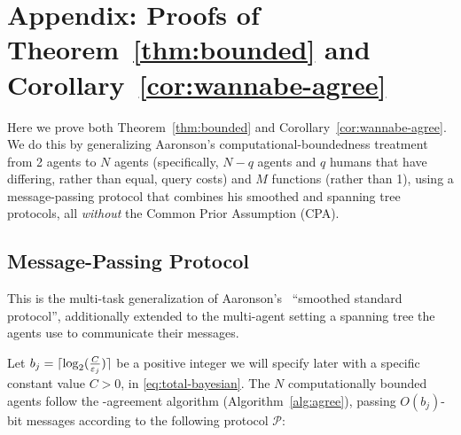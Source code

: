\section{Appendix: Proofs of Theorem~\ref{thm:bounded} and Corollary~\ref{cor:wannabe-agree}}
\label{app:proofs}

Here we prove both Theorem~\ref{thm:bounded} and Corollary~\ref{cor:wannabe-agree}.
We do this by generalizing Aaronson's computational-boundedness treatment~\citep[\S 4]{aaronson2005complexity} from 2 agents to $N$ agents (specifically, $N-q$ agents and $q$ humans that have differing, rather than equal, query costs) and $M$ functions (rather than 1), using a message-passing protocol that combines his smoothed and spanning tree protocols, all \emph{without} the Common Prior Assumption (CPA).
\subsection{Message-Passing Protocol}
\label{app:msp-protocol}
This is the multi-task generalization of Aaronson's~\citep[\S 4.1]{aaronson2005complexity} ``smoothed standard protocol'', additionally extended to the multi-agent setting a spanning tree the agents use to communicate their messages.

Let $b_j=\lceil\log_2(\tfrac{C}{\varepsilon_j})\rceil$ be a positive integer we will specify later with a specific constant value $C > 0$, in \eqref{eq:total-bayesian}.
The $N$ computationally bounded agents follow the \agree-agreement algorithm (Algorithm~\ref{alg:agree}), passing $O(b_j)$-bit messages according to the following protocol $\mathcal{P}$:

